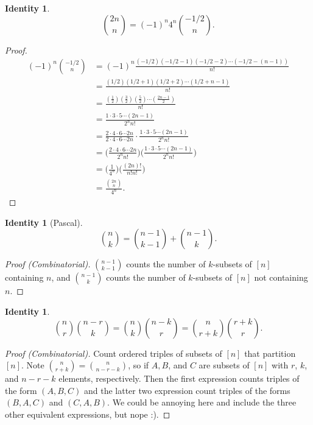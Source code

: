 \documentclass[12]{article}
\newcounter{identityCounter}
\newtheorem{iden}[identityCounter]{Identity}
\theoremstyle{definition}
\begin{document}
	\begin{iden}
		$${2n \choose n} = (-1)^n 4^n {-1/2 \choose n}.$$
	\end{iden}
	\begin{proof}
		\begin{align*}
			(-1)^n {-1/2 \choose n} &= (-1)^n \frac{(-1/2)(-1/2-1)(-1/2-2)\cdots (-1/2-(n-1))}{n!}	\\
			&= \frac{(1/2)(1/2+1)(1/2+2)\cdots(1/2+n-1)}{n!}	\\
			&= \frac{(\tfrac{1}{2})(\tfrac{3}{2})(\tfrac{5}{2})\cdots (\tfrac{2n-1}{2})}{n!}	\\
			&= \frac{1\cdot 3 \cdot 5 \cdots (2n-1)}{2^n n!}	\\
			&= \frac{2\cdot 4 \cdot 6 \cdots 2n}{2\cdot 4 \cdot 6 \cdots 2n} \cdot \frac{1\cdot 3 \cdot 5 \cdots (2n-1)}{2^n n!}	\\
			&= \biggr( \frac{2\cdot 4 \cdot 6 \cdots 2n}{2^n n!} \biggr)  \biggr( \frac{1\cdot 3 \cdot 5 \cdots (2n-1)}{2^n n!} \biggr)	\\
			&= \biggr( \frac{1}{4^n} \biggr) \biggr(\frac{(2n)!}{n! n!}\biggr)	\\
			&= \frac{{2n \choose n}}{4^n}.
		\end{align*}
	\end{proof}
	
	\begin{iden}[Pascal]
		$${n \choose k} = {n-1 \choose k-1} + {n-1 \choose k}.$$
	\end{iden}
	\begin{proof}[Proof (Combinatorial)]
		${n-1 \choose k-1}$ counts the number of $k$-subsets of $[n]$ containing $n$, and ${n-1 \choose k}$ counts the number of $k$-subsets of $[n]$ not containing $n$.
	\end{proof}
	
	\begin{iden}
		$${n \choose r} {n-r \choose k} = {n \choose k} {n-k \choose r} = {n \choose r+k} {r+k \choose r}.$$
	\end{iden}
	\begin{proof}[Proof (Combinatorial)]
		Count ordered triples of subsets of $[n]$ that partition $[n]$.  Note ${n \choose r+k} = {n \choose n-r-k}$, so if $A, B$, and $C$ are subsets of $[n]$ with $r$, $k$, and $n-r-k$ elements, respectively.  Then the first expression counts triples of the form $(A,B,C)$ and the latter two expression count triples of the forms $(B,A,C)$ and $(C,A,B)$.  We could be annoying here and include the three other equivalent expressions, but nope :).
	\end{proof}
\end{document}
